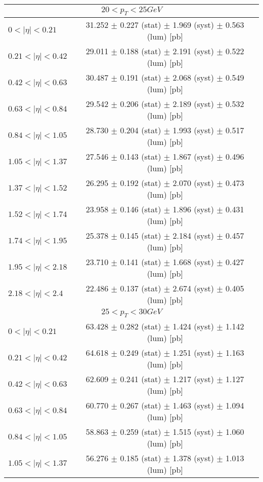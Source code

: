 \begin{tabular}{lc}
\hline
\multicolumn{2}{c}{$20 < p_{T} < 25 GeV$} \\
\hline
$0 < |\eta| <0.21$             & 31.252 $\pm$ 0.227 (stat) $\pm$ 1.969 (syst) $\pm$ 0.563 (lum) [pb]  \\
$0.21 < |\eta| <0.42$          & 29.011 $\pm$ 0.188 (stat) $\pm$ 2.191 (syst) $\pm$ 0.522 (lum) [pb]  \\
$0.42 < |\eta| <0.63$          & 30.487 $\pm$ 0.191 (stat) $\pm$ 2.068 (syst) $\pm$ 0.549 (lum) [pb]  \\
$0.63 < |\eta| <0.84$          & 29.542 $\pm$ 0.206 (stat) $\pm$ 2.189 (syst) $\pm$ 0.532 (lum) [pb]  \\
$0.84 < |\eta| <1.05$          & 28.730 $\pm$ 0.204 (stat) $\pm$ 1.993 (syst) $\pm$ 0.517 (lum) [pb]  \\
$1.05 < |\eta| <1.37$          & 27.546 $\pm$ 0.143 (stat) $\pm$ 1.867 (syst) $\pm$ 0.496 (lum) [pb]  \\
$1.37 < |\eta| <1.52$          & 26.295 $\pm$ 0.192 (stat) $\pm$ 2.070 (syst) $\pm$ 0.473 (lum) [pb]  \\
$1.52 < |\eta| <1.74$          & 23.958 $\pm$ 0.146 (stat) $\pm$ 1.896 (syst) $\pm$ 0.431 (lum) [pb]  \\
$1.74 < |\eta| <1.95$          & 25.378 $\pm$ 0.145 (stat) $\pm$ 2.184 (syst) $\pm$ 0.457 (lum) [pb]  \\
$1.95 < |\eta| <2.18$          & 23.710 $\pm$ 0.141 (stat) $\pm$ 1.668 (syst) $\pm$ 0.427 (lum) [pb]  \\
$2.18 < |\eta| <2.4$           & 22.486 $\pm$ 0.137 (stat) $\pm$ 2.674 (syst) $\pm$ 0.405 (lum) [pb]  \\
\hline
\multicolumn{2}{c}{$25 < p_{T} < 30 GeV$} \\
\hline
$0 < |\eta| <0.21$             & 63.428 $\pm$ 0.282 (stat) $\pm$ 1.424 (syst) $\pm$ 1.142 (lum) [pb]  \\
$0.21 < |\eta| <0.42$          & 64.618 $\pm$ 0.249 (stat) $\pm$ 1.251 (syst) $\pm$ 1.163 (lum) [pb]  \\
$0.42 < |\eta| <0.63$          & 62.609 $\pm$ 0.241 (stat) $\pm$ 1.217 (syst) $\pm$ 1.127 (lum) [pb]  \\
$0.63 < |\eta| <0.84$          & 60.770 $\pm$ 0.267 (stat) $\pm$ 1.463 (syst) $\pm$ 1.094 (lum) [pb]  \\
$0.84 < |\eta| <1.05$          & 58.863 $\pm$ 0.259 (stat) $\pm$ 1.515 (syst) $\pm$ 1.060 (lum) [pb]  \\
$1.05 < |\eta| <1.37$          & 56.276 $\pm$ 0.185 (stat) $\pm$ 1.378 (syst) $\pm$ 1.013 (lum) [pb]  \\

\end{tabular}
